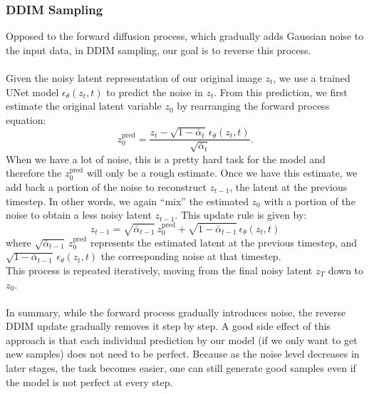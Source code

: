 \subsubsection{DDIM Sampling}
Opposed to the forward diffusion process, which gradually adds Gaussian noise to the input data, in DDIM sampling, our goal is to reverse this process. 
\\\\
Given the noisy latent representation of our original image \( z_t \), 
we use a trained UNet model \(\epsilon_\theta(z_t,t)\) to predict the noise in \( z_t \). 
From this prediction, we first estimate the original latent variable \( z_0 \) by rearranging the forward process equation:
\begin{equation}
    z_0^{\text{pred}} = \frac{z_t - \sqrt{1-\bar{\alpha}_t}\,\epsilon_\theta(z_t,t)}{\sqrt{\bar{\alpha}_t}}.
\end{equation}
When we have a lot of noise, this is a pretty hard task for the model and therefore the \( z_0^{\text{pred}} \) will only be a rough estimate.
Once we have this estimate, we add back a portion of the noise to reconstruct \( z_{t-1} \), the latent at the previous timestep.
In other words, we again “mix” the estimated \( z_0 \) with a portion of the noise to obtain a less noisy latent \( z_{t-1} \).
This update rule is given by:
\begin{equation}
    z_{t-1} = \sqrt{\bar{\alpha}_{t-1}}\,z_0^{\text{pred}} + \sqrt{1-\bar{\alpha}_{t-1}}\,\epsilon_\theta(z_t,t)
\end{equation}
where \(\sqrt{\bar{\alpha}_{t-1}}\,z_0^{\text{pred}}\) represents the estimated latent at the previous timestep, and \(\sqrt{1-\bar{\alpha}_{t-1}}\,\epsilon_\theta(z_t,t)\) the corresponding noise at that timestep.  
\\[1ex]
This process is repeated iteratively, moving from the final noisy latent \( z_T \) down to \( z_0 \).
\\\\
In summary, while the forward process gradually introduces noise, the reverse DDIM update gradually removes it step by step. 
A good side effect of this approach is that each individual prediction by our model (if we only want to get new samples) does not need to be perfect.
Because as the noise level decreases in later stages, the task becomes easier, one can still generate good samples even if the model is not perfect at every step.


